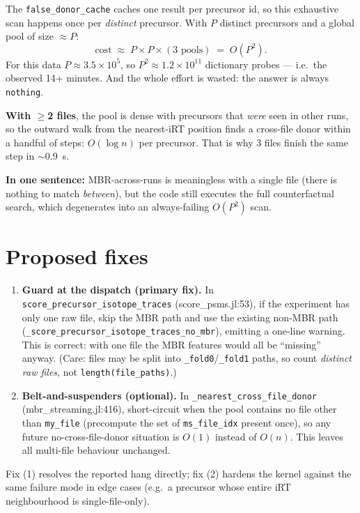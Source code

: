 \documentclass[11pt]{article}
\begin{document}
The \texttt{false\_donor\_cache} caches one result per precursor id, so this exhaustive
scan happens once per \emph{distinct} precursor. With $P$ distinct precursors and a
global pool of size $\approx P$:
\[
\text{cost} \;\approx\; P \times P \times (\text{3 pools}) \;=\; O(P^2).
\]
For this data $P \approx 3.5\times10^5$, so $P^2 \approx 1.2\times10^{11}$ dictionary
probes --- i.e.\ the observed 14+ minutes. And the whole effort is wasted: the answer
is always \texttt{nothing}.

\medskip
\noindent\textbf{With $\ge$2 files}, the pool is dense with precursors that
\emph{were} seen in other runs, so the outward walk from the nearest-iRT position
finds a cross-file donor within a handful of steps: $O(\log n)$ per precursor. That is
why 3 files finish the same step in $\sim$0.9~s.

\medskip
\noindent\textbf{In one sentence:} MBR-across-runs is meaningless with a single file
(there is nothing to match \emph{between}), but the code still executes the full
counterfactual search, which degenerates into an always-failing $O(P^2)$ scan.

\section{Proposed fixes}

\begin{enumerate}
\item \textbf{Guard at the dispatch (primary fix).} In
\texttt{score\_precursor\_isotope\_traces} (score\_psms.jl:53), if the experiment has
only one raw file, skip the MBR path and use the existing non-MBR path
(\texttt{\_score\_precursor\_isotope\_traces\_no\_mbr}), emitting a one-line warning.
This is correct: with one file the MBR features would all be ``missing'' anyway. (Care:
files may be split into \texttt{\_fold0}/\texttt{\_fold1} paths, so count \emph{distinct
raw files}, not \texttt{length(file\_paths)}.)

\item \textbf{Belt-and-suspenders (optional).} In \texttt{\_nearest\_cross\_file\_donor}
(mbr\_streaming.jl:416), short-circuit when the pool contains no file other than
\texttt{my\_file} (precompute the set of \texttt{ms\_file\_idx} present once), so any
future no-cross-file-donor situation is $O(1)$ instead of $O(n)$. This leaves all
multi-file behaviour unchanged.
\end{enumerate}

\noindent Fix (1) resolves the reported hang directly; fix (2) hardens the kernel
against the same failure mode in edge cases (e.g.\ a precursor whose entire iRT
neighbourhood is single-file-only).
\end{document}
